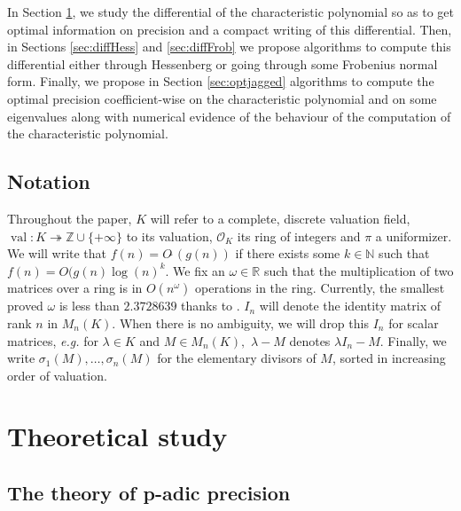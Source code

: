 \documentclass{sig-alternate-05-2015}
\DeclareMathOperator{\val}{val}
\newcommand{\Z}{\mathbb Z}
\newcommand{\OK}{\mathcal{O}_K}
\newcommand{\softO}{O\tilde{~}}
\begin{document}
In Section \ref{sec:theo_study}, we study the
differential of the characteristic polynomial so as
to get optimal information on precision 
and a compact writing of this differential.
Then, in Sections \ref{sec:diffHess} and \ref{sec:diffFrob}
we propose algorithms to compute this differential
either through Hessenberg or going through
some Frobenius normal form.
Finally, we propose in Section \ref{sec:optjagged}
algorithms to compute the optimal precision
coefficient-wise on the characteristic polynomial
and on some eigenvalues along with
numerical evidence of the behaviour of the computation
of the characteristic polynomial.

\subsection*{Notation} Throughout the paper, $K$ will refer to a complete,
discrete valuation field, $\val : K \twoheadrightarrow \Z \cup \{+\infty\}$ to its valuation,
$\OK$ its ring of integers and $\pi$ a uniformizer. 
We will write that $f(n)=\softO (g(n))$ if there exists some
$k \in \mathbb{N}$ such that $f(n)=O(g(n) \log (n)^k.$
We fix an $\omega \in \mathbb{R}$ such that the multiplication
of two matrices over a ring is in $O(n^\omega)$ operations in the
ring. Currently, the smallest proved $\omega$ is less than
$2.3728639 $ thanks to \cite{legall:14a}. 
$I_n$ will denote the identity matrix of rank $n$ in $M_n(K).$
When there is no ambiguity, we will drop this $I_n$
for scalar matrices, \textit{e.g.} for $\lambda \in K$
and $M \in M_n (K),$ $\lambda-M$ denotes $\lambda I_n -M.$
Finally, we write $\sigma_1(M), \dots, \sigma_n(M)$ for the
elementary divisors of $M$, sorted in increasing order of valuation.

\section{Theoretical study}
\label{sec:theo_study}

\subsection{The theory of p-adic precision} \label{sec:padicprec}
\end{document}
